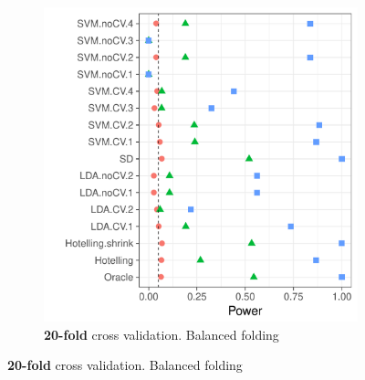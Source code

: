 \documentclass[12pt,a4paper]{article}
\begin{document}
\begin{figure}[h]
\begin{subfigure}{.5\textwidth}
	  \includegraphics[width=1\linewidth]{"art/file6"}
	  \caption{\textbf{20-fold} cross validation. Balanced folding} 
	\label{fig:n_folds_2}
	\end{subfigure}
\end{figure}
\end{document}

